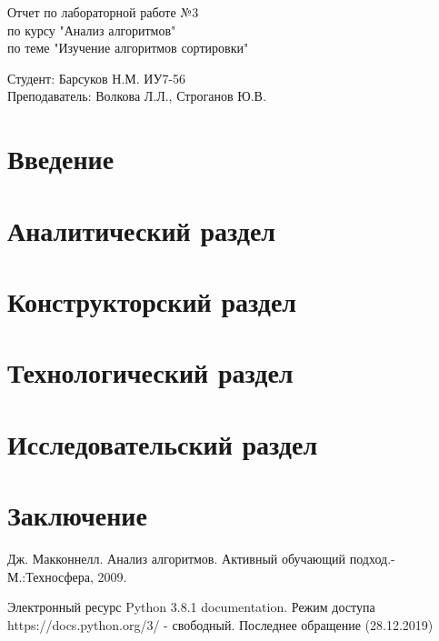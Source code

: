 \documentclass[a4paper, 14pt]{article}
\begin{document}
	\begin{titlepage}
		\begin{center}
			\begin{LARGE}
				Отчет по лабораторной работе №3\\
				по курсу "Анализ алгоритмов"\\
				по теме "Изучение алгоритмов сортировки"
			\end{LARGE}
			
			\begin{Large}
				\vspace{10cm}
				Студент: Барсуков Н.М. ИУ7-56\\
				Преподаватель: Волкова Л.Л.,
				Строганов Ю.В.
			\end{Large}
		\end{center}
	\end{titlepage}

	\newpage
	\tableofcontents

	\newpage
	\section*{Введение}
	
	
	\newpage
	\section{Аналитический раздел}
	
	
	\newpage
	\section{Конструкторский раздел}
	
	
	\newpage
	\section{Технологический раздел}
	
	
	\newpage
	\section{Исследовательский раздел}
	
	
	\newpage
	\section{Заключение}
	
	
	\newpage
	\begin{thebibliography}{4}
		Дж. Макконнелл. Анализ алгоритмов. Активный обучающий подход.-
		М.:Техносфера, 2009.
		
		Электронный ресурс Python 3.8.1 documentation. Режим доступа
		https://docs.python.org/3/ - свободный. Последнее обращение (28.12.2019)
	\end{thebibliography}
	
\end{document}
